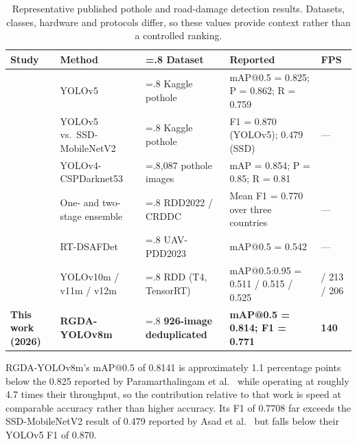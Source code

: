 \documentclass[MScCS]{uccthesis}
\begin{document}
\begin{table}[tbp]
\centering
\small
\setlength{\tabcolsep}{4pt}
\begin{tabularx}{\textwidth}{@{}>{\RaggedRight\arraybackslash}p{2.9cm}
                                >{\RaggedRight\arraybackslash}p{2.4cm}
                                >{\hsize=.8\hsize\RaggedRight\arraybackslash}X
                                >{\hsize=1.2\hsize\RaggedRight\arraybackslash}X
                                >{\RaggedRight\arraybackslash}p{1.5cm}@{}}
\toprule
\textbf{Study} & \textbf{Method} & \textbf{Dataset} &
\textbf{Reported} & \textbf{FPS} \\
\midrule
\textcite{paramarthalingam2024pothole} & YOLOv5 & Kaggle pothole
   & mAP@0.5 = 0.825; P = 0.862; R = 0.759 & 30 \\
\addlinespace[3pt]
\textcite{asad2022pothole} & YOLOv5 vs.\ SSD-MobileNetV2 & Kaggle pothole
   & F1 = 0.870 (YOLOv5); 0.479 (SSD) & --- \\
\addlinespace[3pt]
\textcite{alshaghouri2021realtime} & YOLOv4-CSPDarknet53 & 1,087 pothole images
   & mAP = 0.854; P = 0.85; R = 0.81 & 20 \\
\addlinespace[3pt]
\textcite{ding2022ensemble} & One- and two-stage ensemble & RDD2022 / CRDDC
   & Mean F1 = 0.770 over three countries & --- \\
\addlinespace[3pt]
\textcite{pan2025realtime} & RT-DSAFDet & UAV-PDD2023
   & mAP@0.5 = 0.542 & --- \\
\addlinespace[3pt]
\textcite{abdelwahed2025advancements} & YOLOv10m / v11m / v12m & RDD (T4, TensorRT)
   & mAP@0.5:0.95 = 0.511 / 0.515 / 0.525 & 223 / 213 / 206 \\
\addlinespace[3pt]
\textbf{This work (2026)} & \textbf{RGDA-YOLOv8m} &
   \textbf{926-image deduplicated} &
   \textbf{mAP@0.5 = 0.814; F1 = 0.771} & \textbf{140} \\
\bottomrule
\end{tabularx}
\caption[Comparison with representative published results.]
        {\label{tab:literature}Representative published pothole and
         road-damage detection results. Datasets, classes, hardware and
         protocols differ, so these values provide context rather than a
         controlled ranking.}
\end{table}

RGDA-YOLOv8m's mAP@0.5 of 0.8141 is approximately 1.1 percentage points below
the 0.825 reported by Paramarthalingam et
al.~\parencite{paramarthalingam2024pothole} while operating at roughly 4.7
times their throughput, so the contribution relative to that work is speed at
comparable accuracy rather than higher accuracy. Its F1 of 0.7708 far exceeds
the SSD-MobileNetV2 result of 0.479 reported by Asad et
al.~\parencite{asad2022pothole} but falls below their YOLOv5 F1 of 0.870.
\end{document}
